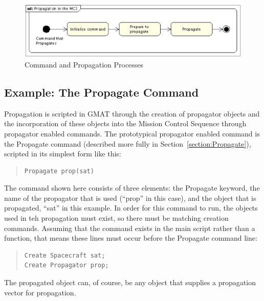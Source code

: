 \begin{figure}[htb]
\begin{center}
\includegraphics[scale=0.5]{Images/PropagationintheMCS.eps}
\caption[Command and Propagation Processes]{\label{figure:CommandPropagationOverview}Command and
Propagation Processes}
\end{center}
\end{figure}

\subsection{Example: The Propagate Command}

Propagation is scripted in GMAT through the creation of propagator objects and the incorporation of
these objects into the Mission Control Sequence through propagator enabled commands.  The
prototypical propagator enabled command is the Propagate command (described more fully in
Section~\ref{section:Propagate}), scripted in its simplest form like this:

\begin{quote}
\begin{verbatim}
Propagate prop(sat)
\end{verbatim}
\end{quote}

\noindent The command shown here consists of three elements: the Propagate keyword, the name of the
propagator that is used (``prop'' in this case), and the object that is propagated, ``sat'' in
this example.  In order for this command to run, the objects used in teh propagation must exist, so
there must be matching creation commands.  Assuming that the command exists in the main script
rather than a function, that means these lines must occur before the Propagate command line:

\begin{quote}
\begin{verbatim}
Create Spacecraft sat;
Create Propagator prop;
\end{verbatim}
\end{quote}

\noindent The propagated object can, of course, be any object that supplies a propagation vector for
propagation.

